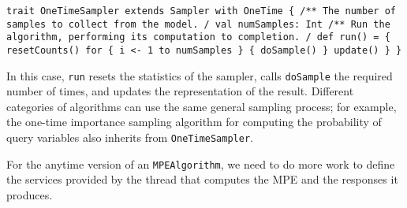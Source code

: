 \begin{flushleft}
\texttt{trait OneTimeSampler extends Sampler with OneTime \{
\newline \tab /**
\newline \tab * The number of samples to collect from the model.
\newline \tab */
\newline \tab val numSamples: Int
\newline 
\newline \tab /**
\newline \tab * Run the algorithm, performing its computation to completion.
\newline \tab */
\newline \tab def run() = \{
\newline \tab resetCounts()
\newline \tab for \{ i <- 1 to numSamples \} \{ doSample() \}
\newline \tab update()
\newline \}
\newline \}
}
\end{flushleft}

In this case, \texttt{run} resets the statistics of the sampler, calls \texttt{doSample} the required number of times, and updates the representation of the result. Different categories of algorithms can use the same general sampling process; for example, the one-time importance sampling algorithm for computing the probability of query variables also inherits from \texttt{OneTimeSampler}.

For the anytime version of an \texttt{MPEAlgorithm}, we need to do more work to define the services provided by the thread that computes the MPE and the responses it produces.

